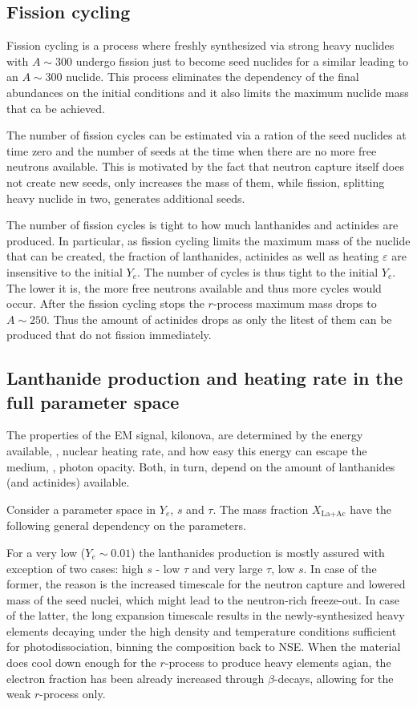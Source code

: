 \subsection{Fission cycling}


Fission cycling is a process where freshly synthesized via strong \rproc{} heavy nuclides with $A\sim 300$ undergo fission just to become seed nuclides for a similar \rproc{} leading to an $A\sim 300$ nuclide. This process eliminates the dependency of the final abundances on the initial conditions and it also limits the maximum nuclide mass that ca be achieved. 

The number of fission cycles can be estimated via a ration of the seed nuclides at time zero and the number of seeds at the time when there are no more free neutrons available. This is motivated by the fact that neutron capture itself does not create new seeds, only increases the mass of them, while fission, splitting heavy nuclide in two, generates additional seeds. 

The number of fission cycles is tight to how much lanthanides and actinides are produced. In particular, as fission cycling limits the maximum mass of the nuclide that can be created, the fraction of lanthanides, actinides as well as heating $\varepsilon$ are insensitive to the initial $Y_e$. The number of cycles is thus tight to the initial $Y_e$. The lower it is, the more free neutrons available and thus more cycles would occur. After the fission cycling stops the $r$-process maximum mass drops to $A\sim 250$. Thus the amount of actinides drops as only the litest of them can be produced that do not fission immediately. 


\subsection{Lanthanide production and heating rate in the full parameter space}

The properties of the \ac{EM} signal, kilonova, are determined by the energy available, \ie, nuclear heating rate, and how easy this energy can escape the medium, \ie, photon opacity. Both, in turn, depend on the amount of lanthanides (and actinides) available. 

Consider a parameter space in $Y_e$, $s$ and $\tau$. The mass fraction $X_{\text{La}+\text{Ac}}$ have the following general dependency on the parameters. 

For a very low ($Y_e \sim 0.01$) the lanthanides production is mostly assured with exception of two cases: high $s$ - low $\tau$ and very large $\tau$, low $s$. In case of the former, the reason is the increased timescale for the neutron capture and lowered mass of the seed nuclei, which might lead to the neutron-rich freeze-out. In case of the latter, the long expansion timescale results in the newly-synthesized heavy elements decaying under the high density and temperature conditions sufficient for photodissociation, binning the composition back to NSE. When the material does cool down enough for the $r$-process to produce heavy elements agian, the electron fraction has been already increased through $\beta$-decays, allowing for the weak $r$-process only. 

